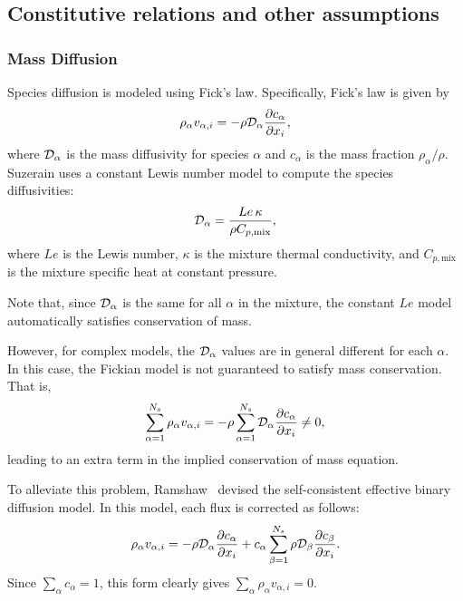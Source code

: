 \subsection{Constitutive relations and other assumptions}
\label{sec:constitutive}

\subsubsection{Mass Diffusion}
Species diffusion is modeled using Fick's law.
Specifically, Fick's law is given by
%
\begin{equation*}
\rho_{\alpha} v_{\alpha, i} = - \rho \mathcal{D}_{\alpha} \frac{\partial c_{\alpha}}{\partial x_i},
\end{equation*}
% 
where $\mathcal{D}_{\alpha}$ is the mass diffusivity for species $\alpha$
and $c_{\alpha}$ is the mass fraction $\rho_{\alpha} / \rho$.
Suzerain uses a constant Lewis number model to compute the species
diffusivities:
%
\begin{equation*}
\mathcal{D}_{\alpha} = \frac{Le \, \kappa}{\rho C_{p,\mathrm{mix}}},
\end{equation*}
%
where $Le$ is the Lewis number, $\kappa$ is the mixture thermal
conductivity, and $C_{p,\mathrm{mix}}$ is the mixture specific heat at
constant pressure.  

Note that, since $\mathcal{D}_{\alpha}$ is the same for all $\alpha$ in
the mixture, the constant $Le$ model automatically satisfies
conservation of mass.

However, for complex models, the $\mathcal{D}_{\alpha}$ values are in
general different for each $\alpha$.  In this case, the Fickian model
is not guaranteed to satisfy mass conservation.  That is,
%
\begin{equation*}
\sum_{\alpha = 1}^{N_s} \rho_{\alpha} v_{\alpha, i} = - \rho \sum_{\alpha = 1}^{N_s} \mathcal{D}_{\alpha} \frac{\partial c_{\alpha}}{\partial x_i} \neq 0,
\end{equation*}
% 
leading to an extra term in the implied conservation of mass
equation.

To alleviate this problem, Ramshaw~\cite{?} devised the self-consistent
effective binary diffusion model.  In this model, each flux is
corrected as follows:
%
\begin{equation*}
\rho_{\alpha} v_{\alpha, i} = - \rho \mathcal{D}_{\alpha} \frac{\partial c_{\alpha}}{\partial x_i} + c_{\alpha} \sum_{\beta = 1}^{N_s} \rho \mathcal{D}_{\beta} \frac{\partial c_{\beta}}{\partial x_i}.
\end{equation*}
% 
Since $\sum_{\alpha} c_{\alpha} = 1$, this form clearly gives
$\sum_{\alpha} \rho_{\alpha} v_{\alpha,i} = 0$.

